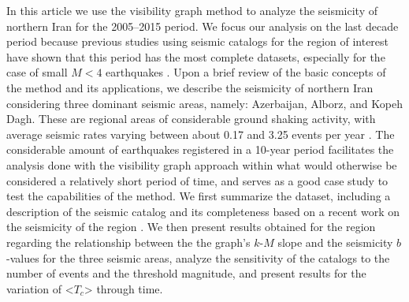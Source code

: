 In this article we use the visibility graph method to analyze the seismicity of northern Iran for the 2005--2015 period. We focus our analysis on the last decade period because previous studies using seismic catalogs for the region of interest have shown that this period has the most complete datasets, especially for the case of small $M<4$ earthquakes \citep[e.g.][]{Khoshnevis2016}. Upon a brief review of the basic concepts of the method and its applications, we describe the seismicity of northern Iran considering three dominant seismic areas, namely: Azerbaijan, Alborz, and Kopeh Dagh. These are regional areas of considerable ground shaking activity, with average seismic rates varying between about 0.17 and 3.25 events per year \citep[e.g.,][]{Nemati2015}. The considerable amount of earthquakes registered in a 10-year period facilitates the analysis done with the visibility graph approach within what would otherwise be considered a relatively short period of time, and serves as a good case study to test the capabilities of the method. We first summarize the dataset, including a description of the seismic catalog and its completeness based on a recent work on the seismicity of the region \citep{Khoshnevis2016}. We then present results obtained for the region regarding the relationship between the the graph's $k$-$M$ slope and the seismicity $b$-values for the three seismic areas, analyze the sensitivity of the catalogs to the number of events and the threshold magnitude, and present results for the variation of <$T_c$> through time.





